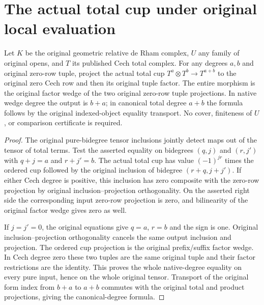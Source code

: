 \section{The actual total cup under original local evaluation}

\begin{theorem}
\label{thm:di-total-cup-original-zero-row}
\leanok
Let $K$ be the original geometric relative de Rham complex, $U$ any
family of original opens, and $T$ its published Cech total complex.
For any degrees $a,b$ and original zero-row tuple, project the actual
total cup $T^a\otimes T^b\to T^{a+b}$ to the original zero Cech row
and then its original tuple factor. The entire morphism is the
original factor wedge of the two original zero-row tuple projections.
In native wedge degree the output is $b+a$; in canonical total degree
$a+b$ the formula follows by the original indexed-object equality
transport. No cover, finiteness of $U$, or comparison certificate is
required.
\end{theorem}
\begin{proof}
\leanok
The original pure-bidegree tensor inclusions jointly detect maps out
of the tensor of total terms. Test the asserted equality on bidegrees
$(q,j)$ and $(r,j')$ with $q+j=a$ and $r+j'=b$. The actual total cup
has value $(-1)^{jr}$ times the ordered cup followed by the original
inclusion of bidegree $(r+q,j+j')$. If either Cech degree is positive,
this inclusion has zero composite with the zero-row projection by
original inclusion--projection orthogonality. On the asserted right
side the corresponding input zero-row projection is zero, and
bilinearity of the original factor wedge gives zero as well.

If $j=j'=0$, the original equations give $q=a$, $r=b$ and the sign is
one. Original inclusion--projection orthogonality cancels the same
output inclusion and projection. The ordered cup projection is the
original prefix/suffix factor wedge. In Cech degree zero these two
tuples are the same original tuple and their factor restrictions are
the identity. This proves the whole native-degree equality on every
pure input, hence on the whole original tensor. Transport of the
original form index from $b+a$ to $a+b$ commutes with the original total
and product projections, giving the canonical-degree formula.
\end{proof}

